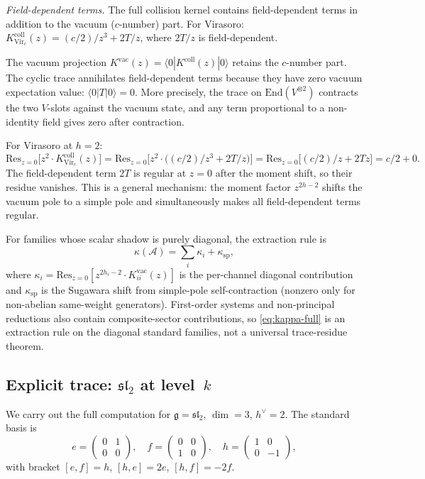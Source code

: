 \documentclass[11pt,reqno]{amsart}
\theoremstyle{definition}
\theoremstyle{remark}
\newcommand{\cA}{\mathcal{A}}
\newcommand{\fg}{\mathfrak{g}}
\newcommand{\End}{\mathrm{End}}
\newcommand{\Res}{\mathrm{Res}}
\numberwithin{equation}{section}
\begin{document}
\medskip\noindent
\emph{Field-dependent terms.}
The full collision kernel contains field-dependent terms in addition
to the vacuum ($c$-number) part. For Virasoro:
$K_{\mathrm{Vir}_c}^{\mathrm{coll}}(z) = (c/2)/z^3 + 2T/z$, where $2T/z$
is field-dependent.

The vacuum projection
$K^{\mathrm{vac}}(z) = \langle 0|K^{\mathrm{coll}}(z)|0\rangle$ retains
the $c$-number part. The cyclic trace annihilates
field-dependent terms because they have zero vacuum expectation
value: $\langle 0|T|0\rangle = 0$. More precisely, the
trace on $\End(V^{\otimes 2})$ contracts the two $V$-slots
against the vacuum state, and any term proportional to a
non-identity field gives zero after contraction.

For Virasoro at $h = 2$:
\[
\Res_{z=0}\bigl[z^2\cdot K_{\mathrm{Vir}_c}^{\mathrm{coll}}(z)\bigr]
= \Res_{z=0}\bigl[z^2\cdot\bigl((c/2)/z^3 + 2T/z\bigr)\bigr]
= \Res_{z=0}\bigl[(c/2)/z + 2Tz\bigr]
= c/2 + 0.
\]
The field-dependent term $2T$ is regular
at $z = 0$ after the moment shift, so their residue vanishes.
This is a general mechanism: the moment factor $z^{2h-2}$
shifts the vacuum pole to a simple pole and simultaneously
makes all field-dependent terms regular.

\medskip
For families whose scalar shadow is purely diagonal, the extraction
rule is
\begin{equation}\label{eq:kappa-full}
\kappa(\cA)
= \sum_i \kappa_i + \kappa_{\mathrm{sp}},
\end{equation}
where $\kappa_i = \Res_{z=0}[z^{2h_i-2}\cdot
K_{ii}^{\mathrm{vac}}(z)]$ is the per-channel diagonal
contribution and $\kappa_{\mathrm{sp}}$ is the Sugawara shift
from simple-pole self-contraction (nonzero only for
non-abelian same-weight generators).
First-order systems and non-principal reductions also contain
composite-sector contributions, so \eqref{eq:kappa-full} is an
extraction rule on the diagonal standard families, not a universal
trace-residue theorem.

\subsection{Explicit trace: $\mathfrak{sl}_2$ at level~$k$}
\label{subsec:sl2-explicit}

We carry out the full computation for $\fg = \mathfrak{sl}_2$,
$\dim = 3$, $h^\vee = 2$. The standard basis is
\[
e = \begin{pmatrix} 0 & 1 \\ 0 & 0 \end{pmatrix},\quad
f = \begin{pmatrix} 0 & 0 \\ 1 & 0 \end{pmatrix},\quad
h = \begin{pmatrix} 1 & 0 \\ 0 & -1 \end{pmatrix},
\]
with bracket $[e,f] = h$, $[h,e] = 2e$, $[h,f] = -2f$.
\end{document}
